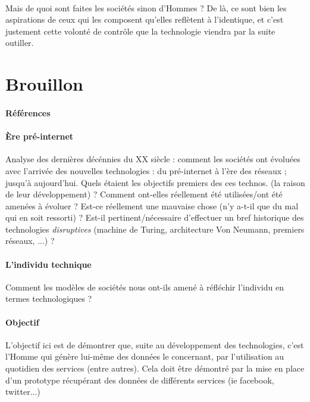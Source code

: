 \paragraph{} Mais de quoi sont faites les sociétés sinon d'Hommes ? De là, ce sont bien les aspirations de ceux qui les 
composent qu'elles reflètent à l'identique, et c'est justement cette volonté de contrôle que la technologie viendra par
la suite outiller.

\section*{Brouillon}

\paragraph{Références} \cite{Marx0} \cite{Marx1} \cite{Nietzsche0}

\paragraph{Ère pré-internet} Analyse des dernières décénnies du XX siècle :
comment les sociétés ont évoluées avec l'arrivée des nouvelles technologies : du
pré-internet à l'ère des réseaux ; jusqu'à aujourd'hui. Quels étaient les objectifs
premiers des ces technos. (la raison de leur développement) ? Comment ont-elles réellement
été utilisées/ont été amenées à évoluer ? Est-ce réellement une mauvaise chose (n'y
a-t-il que du mal qui en soit ressorti) ? Est-il pertinent/nécessaire d'effectuer un bref
historique des technologies \emph{disruptives} (machine de Turing, architecture
Von Neumann, premiers réseaux, ...) ?

\paragraph{L'individu technique} Comment les modèles de sociétés nous ont-ils amené à
réfléchir l'individu en termes technologiques ?

\paragraph{Objectif} L'objectif ici est de démontrer que, suite au développement des technologies, c'est l'Homme
qui génère lui-même des données le concernant, par l'utilisation au quotidien des services (entre autres).
Cela doit être démontré par la mise en place d'un prototype récupérant des données de différents
services (ie facebook, twitter...)

